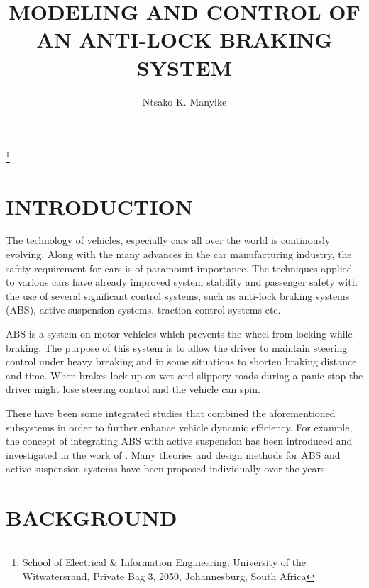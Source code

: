 \documentclass[10pt,twocolumn]{witseiepaper}
\begin{document}
\title{MODELING AND CONTROL OF AN ANTI-LOCK BRAKING SYSTEM}

\author{Ntsako K. Manyike}

\thanks{School of Electrical \& Information Engineering, University of the
Witwatersrand, Private Bag 3, 2050, Johannesburg, South Africa}



%
\abstract{}

\keywords{}


\maketitle
\thispagestyle{empty}\pagestyle{empty}


%
\section{INTRODUCTION}

The technology of vehicles, especially cars all over the world is continously evolving. Along with the many advances in the car manufacturing industry, the safety requirement for cars is of paramount importance. The techniques applied to various cars have already improved system stability and passenger safety with the use of several significant control systems, such as anti-lock braking systems (ABS), active suspension systems, traction control systems etc. 

ABS is a system on motor vehicles which prevents the wheel from locking while braking. The purpose of this system is to allow the driver to maintain steering control under heavy breaking and in some situations to shorten braking distance and time. When brakes lock up on wet and slippery roads during a panic stop the driver might lose steering control and the vehicle can spin.

There have been some integrated studies that combined the aforementioned subsystems in order to further enhance vehicle dynamic efficiency. For example, the concept of integrating ABS with active suspension has been introduced and investigated in the work of \cite{Alleyne:1997}. Many theories and design methods for ABS and active suspension systems have been proposed individually over the years. 

\section{BACKGROUND}
\end{document}
